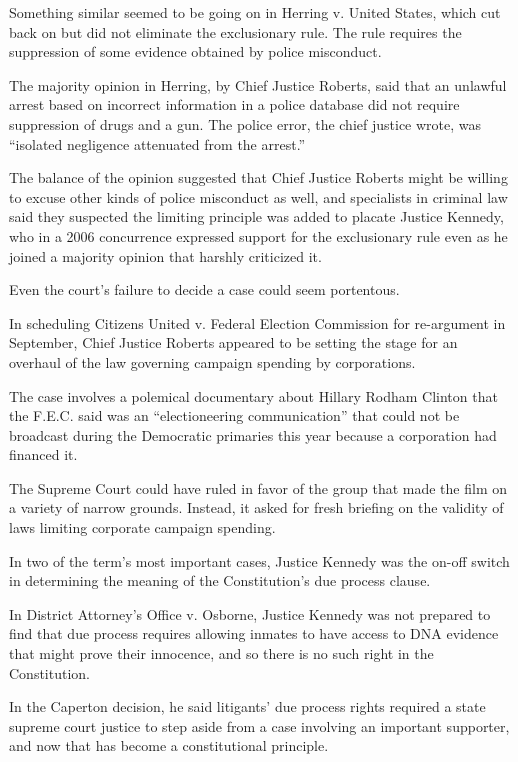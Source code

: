 ﻿\documentclass[12pt]{article}
\begin{document}
Something similar seemed to be going on in Herring v. United States, which cut back on but did not
eliminate the exclusionary rule. The rule requires the suppression of some evidence obtained by
police misconduct.

The majority opinion in Herring, by Chief Justice Roberts, said that an unlawful arrest based on
incorrect information in a police database did not require suppression of drugs and a gun. The
police error, the chief justice wrote, was ``isolated negligence attenuated from the arrest.''

The balance of the opinion suggested that Chief Justice Roberts might be willing to excuse other
kinds of police misconduct as well, and specialists in criminal law said they suspected the limiting
principle was added to placate Justice Kennedy, who in a 2006 concurrence expressed support for the
exclusionary rule even as he joined a majority opinion that harshly criticized it.

Even the court's failure to decide a case could seem portentous.

In scheduling Citizens United v. Federal Election Commission for re-argument in September, Chief
Justice Roberts appeared to be setting the stage for an overhaul of the law governing campaign
spending by corporations.

The case involves a polemical documentary about Hillary Rodham Clinton that the F.E.C. said was an
``electioneering communication'' that could not be broadcast during the Democratic primaries this
year because a corporation had financed it.

The Supreme Court could have ruled in favor of the group that made the film on a variety of narrow
grounds. Instead, it asked for fresh briefing on the validity of laws limiting corporate campaign
spending.

In two of the term's most important cases, Justice Kennedy was the on-off switch in determining the
meaning of the Constitution's due process clause.

In District Attorney's Office v. Osborne, Justice Kennedy was not prepared to find that due process
requires allowing inmates to have access to DNA evidence that might prove their innocence, and so
there is no such right in the Constitution.

In the Caperton decision, he said litigants' due process rights required a state supreme court
justice to step aside from a case involving an important supporter, and now that has become a
constitutional principle.
\end{document}
